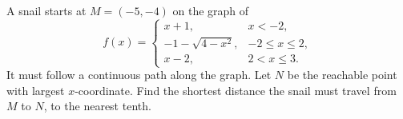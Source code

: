 A snail starts at $M=(-5,-4)$ on the graph of
\[
f(x)=\begin{cases}x+1,&x<-2,\\-1-\sqrt{4-x^2},&-2\le x\le2,\\x-2,&2<x\le3.\end{cases}
\]
It must follow a continuous path along the graph. Let $N$ be the reachable point with largest $x$-coordinate. Find the shortest distance the snail must travel from $M$ to $N$, to the nearest tenth.
